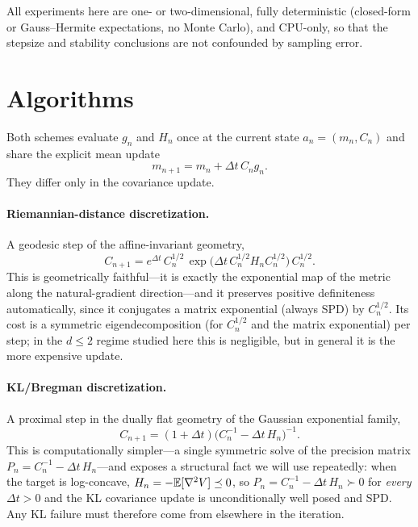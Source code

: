 \documentclass[11pt]{article}
\begin{document}
All experiments here are one- or two-dimensional, fully deterministic (closed-form
or Gauss--Hermite expectations, no Monte Carlo), and CPU-only, so that the
stepsize and stability conclusions are not confounded by sampling error.

\section{Algorithms}\label{sec:algos}

Both schemes evaluate $g_n$ and $H_n$ once at the current state $a_n=(m_n,C_n)$
and share the explicit mean update
\begin{equation}\label{eq:mean}
m_{n+1}=m_n+\Delta t\,C_n g_n .
\end{equation}
They differ only in the covariance update.

\paragraph{Riemannian-distance discretization.}
A geodesic step of the affine-invariant geometry,
\begin{equation}\label{eq:riem}
C_{n+1}=e^{\Delta t}\,C_n^{1/2}\,
\exp\!\big(\Delta t\,C_n^{1/2}H_nC_n^{1/2}\big)\,C_n^{1/2}.
\end{equation}
This is geometrically faithful---it is exactly the exponential map of the
metric along the natural-gradient direction---and it preserves positive
definiteness automatically, since it conjugates a matrix exponential (always SPD)
by $C_n^{1/2}$. Its cost is a symmetric eigendecomposition (for $C_n^{1/2}$ and
the matrix exponential) per step; in the $d\le2$ regime studied here this is
negligible, but in general it is the more expensive update.

\paragraph{KL/Bregman discretization.}
A proximal step in the dually flat geometry of the Gaussian exponential family,
\begin{equation}\label{eq:kl}
C_{n+1}=(1+\Delta t)\big(C_n^{-1}-\Delta t\,H_n\big)^{-1}.
\end{equation}
This is computationally simpler---a single symmetric solve of the precision
matrix $P_n=C_n^{-1}-\Delta t\,H_n$---and exposes a structural fact we will use
repeatedly: when the target is log-concave, $H_n=-\mathbb{E}[\nabla^2 V]\preceq0$, so
$P_n=C_n^{-1}-\Delta t\,H_n\succ0$ for \emph{every} $\Delta t>0$ and the KL
covariance update is unconditionally well posed and SPD. Any KL failure must
therefore come from elsewhere in the iteration.
\end{document}
